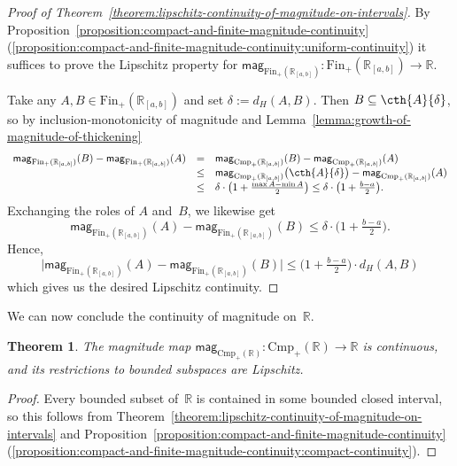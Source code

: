 \documentclass[11pt]{article}
\theoremstyle{plain}
\newtheorem{theorem}{Theorem}[section]
\theoremstyle{definition}
\newcommand{\RR}{\mathbb{R}}
\newcommand{\intcc}[3][\RR]{{#1}_{[#2, #3]}}
\newcommand{\mg}[1][]{\mathsf{mag}_{#1}}
\newcommand{\fsub}{\mathrm{Fin}}
\newcommand{\ifsub}{\fsub_{+}}
\newcommand{\csub}{\mathrm{Cmp}}
\newcommand{\icsub}{\csub_{+}}
\begin{document}
\begin{proof}[Proof of Theorem~\ref{theorem:lipschitz-continuity-of-magnitude-on-intervals}]
By Proposition~\ref{proposition:compact-and-finite-magnitude-continuity}(\ref{proposition:compact-and-finite-magnitude-continuity:uniform-continuity}) it suffices to prove the Lipschitz property for  $\mg[\ifsub(\intcc{a}{b})]\colon \ifsub(\intcc{a}{b}) \to \RR$.

Take any $A, B \in \ifsub(\intcc{a}{b})$ and set $\delta := d_H(A, B)$. Then $B \subseteq \cth{A}{\delta}$, so by inclusion-monotonicity of magnitude and Lemma~\ref{lemma:growth-of-magnitude-of-thickening}
\[
\begin{array}{rcl}\mg[\ifsub(\intcc{a}{b})](B) - \mg[\ifsub(\intcc{a}{b})](A) &=&
\mg[\icsub(\intcc{a}{b})](B) - \mg[\icsub(\intcc{a}{b})](A)\\
&\leq& \mg[\icsub(\intcc{a}{b})]\big(\cth{A}{\delta}\big) - \mg[\icsub(\intcc{a}{b})](A)\\ 
&\leq & \delta \cdot \big(1 + \tfrac{\max{A} - \min{A}}{2}\big) \leq \delta \cdot \big(1 + \tfrac{b - a}{2}\big).
\end{array}\]
Exchanging the roles of $A$ and~$B$, we likewise get 
\[\mg[\ifsub(\intcc{a}{b})](A) - \mg[\ifsub(\intcc{a}{b})](B) \leq \delta \cdot \big(1 + \tfrac{b - a}{2}\big).\] Hence,
\[\big|\mg[\ifsub(\intcc{a}{b})](A) - \mg[\ifsub(\intcc{a}{b})](B)\big| \leq \big(1 + \tfrac{b - a}{2}\big) \cdot d_H(A, B)\]
which gives us the desired Lipschitz continuity.
\end{proof}


We can now conclude the continuity of magnitude on~$\RR$.

\begin{theorem}\label{thm:continuity_on_R}
The magnitude map $\mg[\icsub(\RR)]\colon \icsub(\RR) \to \RR$ is continuous, and its restrictions to bounded subspaces are Lipschitz.
\end{theorem}

\begin{proof}
Every bounded subset of~$\RR$ is contained in some bounded closed interval, so this follows from Theorem~\ref{theorem:lipschitz-continuity-of-magnitude-on-intervals} and Proposition~\ref{proposition:compact-and-finite-magnitude-continuity}(\ref{proposition:compact-and-finite-magnitude-continuity:compact-continuity}).
\end{proof}
\end{document}
